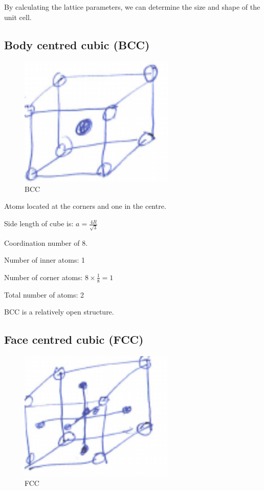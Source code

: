 \documentclass{article}
\begin{document}
By calculating the lattice parameters, we can determine the size and shape of the unit cell.

\subsection{Body centred cubic (BCC)}
\begin{figure}[h!]
	\centering
	\includegraphics[width=0.66\textwidth]{assets/993a2f1f.png}
	\caption{BCC}
\end{figure}
Atoms located at the corners and one in the centre.

Side length of cube is: $a = \frac{4R}{\sqrt{3}}$

Coordination number of 8.

Number of inner atoms: 1

Number of corner atoms: $8\times\frac{1}{8} = 1$

Total number of atoms: 2

BCC is a relatively open structure.

\subsection{Face centred cubic (FCC)}
\begin{figure}[H]
	\centering
	\includegraphics[width=0.66\textwidth]{assets/47a540f6.png}
	\caption{FCC}
\end{figure}
\end{document}
